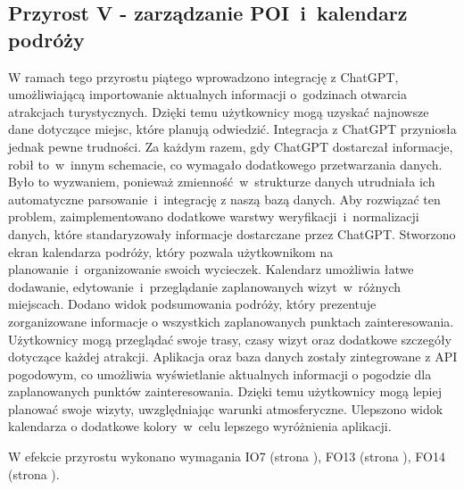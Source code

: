     \subsection{Przyrost V - zarządzanie POI~i~kalendarz podróży}
    \label{sec:przyrost5}

    W ramach tego przyrostu piątego wprowadzono integrację z ChatGPT, umożliwiającą importowanie aktualnych informacji o~godzinach otwarcia atrakcjach turystycznych. 
    Dzięki temu użytkownicy mogą uzyskać najnowsze dane dotyczące miejsc, które planują odwiedzić.\newline
    \indent Integracja z ChatGPT przyniosła jednak pewne trudności. Za każdym razem, gdy ChatGPT dostarczał informacje, robił to~w~innym schemacie, 
    co wymagało dodatkowego przetwarzania danych. Było to wyzwaniem, ponieważ zmienność~w~strukturze danych utrudniała ich automatyczne parsowanie~i~integrację z naszą bazą danych. \newline 
    \indent Aby rozwiązać ten problem, zaimplementowano dodatkowe warstwy weryfikacji~i~normalizacji danych, które standaryzowały informacje dostarczane przez ChatGPT.\newline
    \indent Stworzono ekran kalendarza podróży, który pozwala użytkownikom na planowanie~i~organizowanie swoich wycieczek.
    Kalendarz umożliwia łatwe dodawanie, edytowanie~i~przeglądanie zaplanowanych wizyt~w~różnych miejscach.\newline
    \indent Dodano widok podsumowania podróży, który prezentuje zorganizowane informacje o wszystkich zaplanowanych punktach zainteresowania. 
    Użytkownicy mogą przeglądać swoje trasy, czasy wizyt oraz dodatkowe szczegóły dotyczące każdej atrakcji. \newline
    \indent Aplikacja oraz baza danych zostały zintegrowane z API pogodowym, co umożliwia wyświetlanie aktualnych informacji o pogodzie dla zaplanowanych punktów zainteresowania. 
    Dzięki temu użytkownicy mogą lepiej planować swoje wizyty, uwzględniając warunki atmosferyczne. \newline
    Ulepszono widok kalendarza o dodatkowe kolory~w~celu lepszego wyróżnienia aplikacji. 

    W efekcie przyrostu wykonano wymagania IO7 (strona \pageref{tab:requirements:env7}), FO13 (strona \pageref{tab:requirements:func13}), FO14 (strona \pageref{tab:requirements:func14}).

